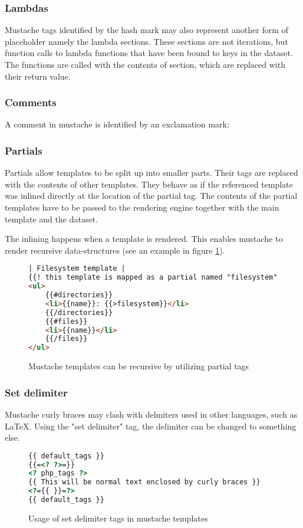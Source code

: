 \documentclass[thesis.tex]{subfiles}
\begin{document}
\subsubsection{Lambdas}
Mustache tags identified by the hash mark may also represent another form of
placeholder namely the lambda sections. These sections are not iterations, but
function calls to lambda functions that have been bound to keys in the dataset.
The functions are called with the contents of section, which are replaced
with their return value.

\subsubsection{Comments}
A comment in mustache is identified by an exclamation mark:

\subsubsection{Partials}
Partials allow templates to be split up into smaller parts. Their tags are
replaced with the contents of other templates. They behave as if the referenced
template was inlined directly at the location of the partial tag.
The contents of the partial templates have to be passed to the rendering engine
together with the main template and the dataset.

The inlining happens when a template is rendered. This enables mustache to
render recursive data-structures
(see an example in figure \ref{fig:partial.mustache}).
\begin{figure}
	\centering
	\caption{Mustache templates can be recursive by utilizing partial tags}
	\label{fig:partial.mustache}
	\begin{lstlisting}[language=HTML]
| Filesystem template |
{{! this template is mapped as a partial named "filesystem" }}
<ul>
	{{#directories}}
	<li>{{name}}: {{>filesystem}}</li>
	{{/directories}}
	{{#files}}
	<li>{{name}}</li>
	{{/files}}
</ul>
	\end{lstlisting}
\end{figure}

\subsubsection{Set delimiter}
Mustache curly braces may clash with delmiters used in other languages,
such as LaTeX. Using the "set delimiter" tag, the delimiter can be changed to
something else.
\begin{figure}
	\centering
	\caption{Usage of set delimiter tags in mustache templates}
	\label{fig:set-delim.mustache}
	\begin{lstlisting}[language=HTML]
{{ default_tags }}
{{=<? ?>=}}
<? php_tags ?>
{{ This will be normal text enclosed by curly braces }}
<?={{ }}=?>
{{ default_tags }}
	\end{lstlisting}
\end{figure}
\end{document}
